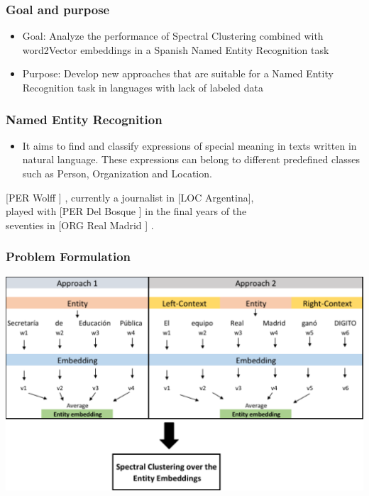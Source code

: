\documentclass{beamer}
\begin{document}
\begin{frame}
\frametitle{Goal and purpose}
\begin{itemize} 
\item Goal: Analyze the performance of Spectral Clustering combined with word2Vector embeddings in a Spanish Named Entity Recognition task
\item Purpose: Develop new approaches that are suitable for a Named Entity Recognition task in languages with lack of labeled data
\end{itemize}
 \end{frame}
 
 
 \begin{frame}
 	\frametitle{Named Entity Recognition}
 	\begin{itemize} 
 		\item It aims to find and classify expressions of special meaning in texts written in natural language.  These expressions can belong to different predefined classes such as Person, Organization and Location.  
 	\end{itemize}
 
 \hspace{1cm} [PER Wolff ] , currently a journalist in [LOC Argentina],  \\
  \hspace{1cm} played with [PER Del Bosque ] in the final years of the \\ 
  \hspace{1cm} seventies in [ORG Real Madrid ] .
 \end{frame}
 

\begin{frame}
\frametitle{Problem Formulation}
\begin{center}
	\includegraphics[width=0.8\linewidth]{../REPORT/Figures/EntityEmb_pres.png} 
\end{center}
\end{frame}
\end{document}

